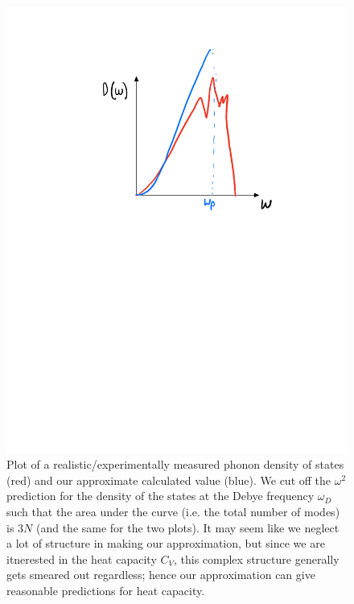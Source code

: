 \begin{figure}[htbp]
    \centering
    \includegraphics[scale=0.6]{Images/fig-phonondensityofstates.pdf}

    \caption{Plot of a realistic/experimentally measured phonon density of states (red) and our approximate calculated value (blue). We cut off the $\omega^2$ prediction for the density of the states at the Debye frequency $\omega_D$ such that the area under the curve (i.e. the total number of modes) is $3N$ (and the same for the two plots). It may seem like we neglect a lot of structure in making our approximation, but since we are itnerested in the heat capacity $C_V$, this complex structure generally gets smeared out regardless; hence our approximation can give reasonable predictions for heat capacity.}
    \label{fig-phonondensityofstates}
\end{figure}

